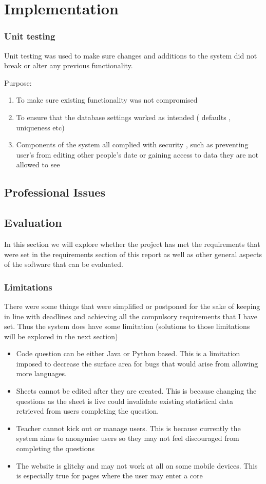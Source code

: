 \chapter{Implementation}

\subsection{Unit testing}
Unit testing was used to make sure changes and additions to the system did not break or alter any previous functionality.

Purpose:
\begin{enumerate}
	\item To make sure existing functionality was not compromised
	\item To ensure that the database settings worked as intended ( defaults , uniqueness etc)
	\item Components of the system all complied with security , such as preventing user's from editing other people's date or gaining access to data they are not allowed to see
\end{enumerate}


\section{Professional Issues}

\section{Evaluation}
In this section we will explore whether the project has met the requirements that were set in the requirements section of this report as well as other general aspects of the software that can be evaluated.

\subsection{Limitations}
There were some things that were simplified or postponed for the sake of keeping in line with deadlines and achieving all the compulsory requirements that I have set. Thus the system does have some limitation (solutions to those limitations will be explored in the next section)

\begin{itemize}
	\item Code question can be either Java or Python based. This is a limitation imposed to decrease the surface area for bugs that would arise from allowing more languages.
	\item Sheets cannot be edited after they are created. This is because changing the questions as the sheet is live could invalidate existing statistical data retrieved from users completing the question.
	\item Teacher cannot kick out or manage users. This is because currently the system aims to anonymise users so they may not feel discouraged from completing the questions
	\item The website is glitchy and may not work at all on some mobile devices. This is especially true for pages where the user may enter a core
\end{itemize}

